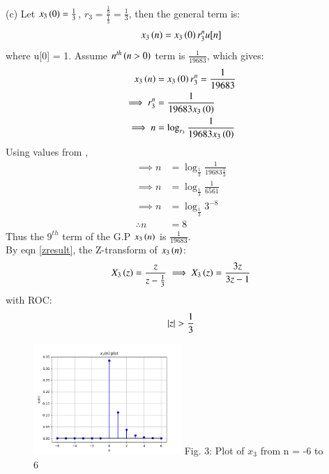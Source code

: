 \documentclass[journal,12pt,twocolumn]{IEEEtran}
\theoremstyle{remark}
\begin{document}
(c) Let $x_3\left(0\right) = \frac{1}{3}$, $r_3 = \frac{\frac{1}{9}}{\frac{1}{3}} = \frac{1}{3}$, then the general term is:
\begin{align}
    x_3\left(n\right) = x_3\left(0\right) r_3^nu[n]
\end{align}
where u[0] = 1. Assume $n^{th}\left(n > 0\right)$ term is $\frac{1}{19683}$, which gives: 
\begin{align}
    x_3\left(n\right) &= x_3\left(0\right) r_3^n = \frac{1}{19683}\\
    \implies r_3^n &= \frac{1}{19683 x_3\left(0\right)}\\
    \implies n &= \log_{r_3}{\frac{1}{19683 x_3\left(0\right)}}
\end{align}
Using values from ,
\begin{align}
    \implies n &= \log_{\frac{1}{3}}{\frac{1}{19683 \frac{1}{3}}}\\
    \implies n &= \log_{\frac{1}{3}}{\frac{1}{6561}}\\
    \implies n &= \log_{\frac{1}{3}}{3^{-8}}\\
    \therefore n &= 8
\end{align}
Thus the $9^{th}$ term of the G.P $x_3\left(n\right)$ is $\frac{1}{19683}$.\\
By eqn \ref{zresult}, the Z-transform of $x_3\left(n\right)$:
\begin{align}
    X_3\left(z\right) = \frac{z}{z - \frac{1}{3}}
    \implies X_3\left(z\right) = \frac{3z}{3z - 1}
\end{align} with ROC: \[ \left\vert z\right\vert > \frac{1}{3} \]

\begin{figure}[h!]
    \centering
    \includegraphics[width=0.5\textwidth]{figs/c.png}
    Fig. 3: Plot of $x_3$ from n = -6 to 6
    \label{fig:img3}
\end{figure}


\end{document}
